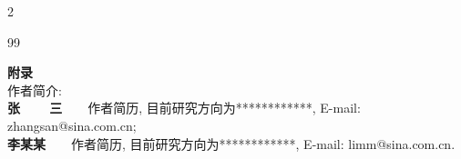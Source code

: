 \begin{multicols}{2}
{\begin{thebibliography}{99}
\end{thebibliography}}
 \vskip 7pt
\normalsize\textbf{附录}\\
\indent
 {\fontsize{9.3pt}{11.6pt}}
 \vskip 7pt
\noindent
{ 作者简介:}\\
 {\scriptsize
\indent
\textbf{张~~~~三}~~~~作者简历, 目前研究方向为************, E-mail: zhangsan@sina.com.cn;\\
\indent \textbf{李某某}~~~~作者简历, 目前研究方向为************,
E-mail: limm@sina.com.cn.}
\end{multicols}
\clearpage


